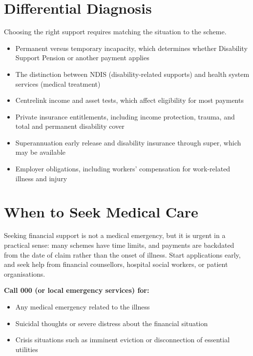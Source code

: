 \section*{Differential Diagnosis}
Choosing the right support requires matching the situation to the scheme.
\begin{itemize}
    \item Permanent versus temporary incapacity, which determines whether Disability Support Pension or another payment applies
    \item The distinction between NDIS (disability-related supports) and health system services (medical treatment)
    \item Centrelink income and asset tests, which affect eligibility for most payments
    \item Private insurance entitlements, including income protection, trauma, and total and permanent disability cover
    \item Superannuation early release and disability insurance through super, which may be available
    \item Employer obligations, including workers' compensation for work-related illness and injury
\end{itemize}

\section*{When to Seek Medical Care}
Seeking financial support is not a medical emergency, but it is urgent in a practical sense: many schemes have time limits, and payments are backdated from the date of claim rather than the onset of illness. Start applications early, and seek help from financial counsellors, hospital social workers, or patient organisations.

\textbf{Call 000 (or local emergency services) for:}
\begin{itemize}
    \item Any medical emergency related to the illness
    \item Suicidal thoughts or severe distress about the financial situation
    \item Crisis situations such as imminent eviction or disconnection of essential utilities
\end{itemize}

